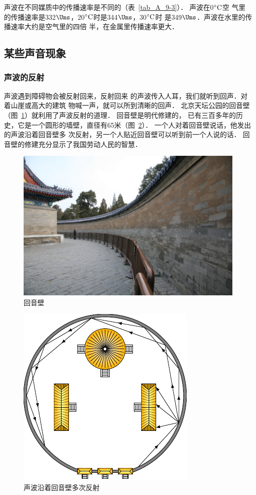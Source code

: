 声波在不同媒质中的传播速率是不同的（表~\ref{tab_A_9-3}）．
声波在0$^\circ {\rm C}$空
气里的传播速率是332$\Ums$，20$^\circ {\rm C}$时是344$\Ums$，30$^\circ {\rm C}$时
是349$\Ums$．声波在水里的传播速率大约是空气里的四倍
半，在金属里传播速率更大．

\subsection{某些声音现象}
\subsubsection{声波的反射}

声波遇到障碍物会被反射回来，反射回来
的声波传入人耳，我们就听到回声．对着山崖或高大的建筑
物喊一声，就可以所到清晰的回声．
北京天坛公园的回音壁
（图~\ref{fig_A_9-27}）就利用了声波反射的道理．
回音壁是明代修建的，
已有三百多年的历史，它是一个圆形的墙壁，直径有65米（图~\ref{fig_A_9-28}）．
一个人对着回音壁说话，他发出的声波沿着回音壁多
次反射，另一个人贴近回音壁可以听到前一个人说的话．
回音壁的修建充分显示了我国劳动人民的智慧．

\begin{figure}[htbp]
    \centering
    \includegraphics[scale=0.28]{fig/A/9-27.jpg}
    \caption{回音壁}\label{fig_A_9-27}
\end{figure}

\begin{figure}[htbp]
    \centering
    \includegraphics{fig/A/9-28.pdf}
    \caption{声波沿着回音壁多次反射}\label{fig_A_9-28}
\end{figure}

